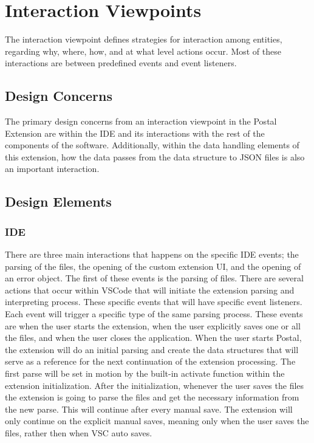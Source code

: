 \documentclass[letterpaper,10pt,titlepage,draftclsnofoot,onecolumn,onesided] {IEEEtran}
\begin{document}
\section{Interaction Viewpoints}
The interaction viewpoint defines strategies for interaction among entities, regarding why, where, how, and
at what level actions occur. Most of these interactions are between predefined events and event listeners.

\subsection{Design Concerns}
The primary design concerns from an interaction viewpoint in the Postal Extension are within the IDE and its interactions with the rest of the components of the software.
Additionally, within the data handling elements of this extension, how the data passes from the data structure to JSON files is also an important interaction.

\subsection{Design Elements}

\subsubsection{IDE}	
There are three main interactions that happens on the specific IDE events; the parsing of the files, the opening of the custom extension UI, and the opening of an error object.
The first of these events is the parsing of files. 
There are several actions that occur within VSCode that will initiate the extension parsing and interpreting process.
These specific events that will have specific event listeners. 
Each event will trigger a specific type of the same parsing process.
These events are when the user starts the extension, when the user explicitly saves one or all the files, and when the user closes the application.
When the user starts Postal, the extension will do an initial parsing and create the data structures that will serve as a reference for the next continuation of the extension processing.
The first parse will be set in motion by the built-in activate function within the extension initialization. 
After the initialization, whenever the user saves the files the extension is going to parse the files and get the necessary information from the new parse. 
This will continue after every manual save.
The extension will only continue on the explicit manual saves, meaning only when the user saves the files, rather then when VSC auto saves. 
	
\end{document}
